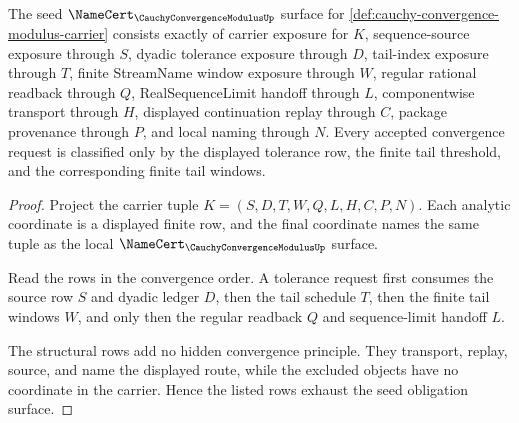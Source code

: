 \begin{theorem}
\label{thm:cauchy-convergence-modulus-namecert-obligations}
The seed $\NameCert_{\CauchyConvergenceModulusUp}$ surface for \autoref{def:cauchy-convergence-modulus-carrier} consists exactly of carrier exposure for $K$, sequence-source exposure through $S$, dyadic tolerance exposure through $D$, tail-index exposure through $T$, finite StreamName window exposure through $W$, regular rational readback through $Q$, RealSequenceLimit handoff through $L$, componentwise transport through $H$, displayed continuation replay through $C$, package provenance through $P$, and local naming through $N$. Every accepted convergence request is classified only by the displayed tolerance row, the finite tail threshold, and the corresponding finite tail windows.
\end{theorem}
\begin{proof}
Project the carrier tuple $K=(S,D,T,W,Q,L,H,C,P,N)$. Each analytic coordinate is a displayed finite row, and the final coordinate names the same tuple as the local $\NameCert_{\CauchyConvergenceModulusUp}$ surface.

Read the rows in the convergence order. A tolerance request first consumes the source row $S$ and dyadic ledger $D$, then the tail schedule $T$, then the finite tail windows $W$, and only then the regular readback $Q$ and sequence-limit handoff $L$.

The structural rows add no hidden convergence principle. They transport, replay, source, and name the displayed route, while the excluded objects have no coordinate in the carrier. Hence the listed rows exhaust the seed obligation surface.
\end{proof}

